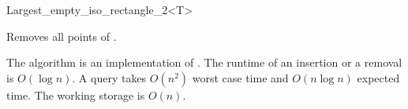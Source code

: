 \begin{ccRefClass}{Largest_empty_iso_rectangle_2<T>}

{Removes all points of \ccVar.}


\ccImplementation

The algorithm is an implementation of \cite{o-naler-90}. The runtime of an
insertion or a removal is $O(\log n)$. A query takes $O(n^2)$ worst
case time and $O(n \log n)$ expected time. The working storage is $
O(n)$.












\end{ccRefClass}


